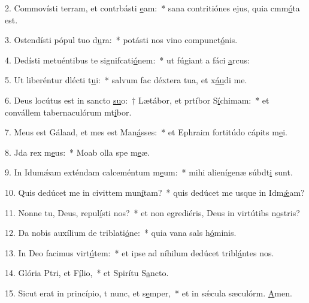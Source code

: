 2. Commovísti terram, et contrbásti \uline{e}am:~* sana contritiónes ejus, quia cmm\uline{ó}ta est.\par 
3. Ostendísti pópul tuo d\uline{u}ra:~* potásti nos vino compunct\uline{ó}nis.\par 
4. Dedísti metuéntibus te signifcati\uline{ó}nem:~* ut fúgiant a fáci \uline{a}rcus:\par 
5. Ut liberéntur dlécti t\uline{u}i:~* salvum fac déxtera tua, et x\uline{áu}di me.\par 
6. Deus locútus est in sancto \uline{su}o:~† Lætábor, et prtíbor S\uline{í}chimam:~* et convállem tabernaculórum mt\uline{í}bor.\par 
7. Meus est Gálaad, et mes est Man\uline{á}sses:~* et Ephraim fortitúdo cápits m\uline{e}i.\par 
8. Jda rex m\uline{e}us:~* Moab olla spe m\uline{e}æ.\par 
9. In Idumǽam exténdam calceméntum m\uline{e}um:~* mihi alienígenæ súbdt\uline{i} sunt.\par 
10. Quis dedúcet me in civittem mun\uline{í}tam?~* quis dedúcet me usque in Idm\uline{ǽ}am?\par 
11. Nonne tu, Deus,  repul\uline{í}sti nos?~* et non egrediéris, Deus in virtútibs n\uline{o}stris?\par 
12. Da nobis auxílium de triblati\uline{ó}ne:~* quia vana sals h\uline{ó}minis.\par 
13. In Deo facimus virt\uline{ú}tem:~* et ipse ad níhilum dedúcet tribl\uline{á}ntes nos.\par 
14. Glória Ptri, et F\uline{í}lio,~* et Spirítu S\uline{a}ncto.\par 
15. Sicut erat in princípio, t nunc, et s\uline{e}mper,~* et in sǽcula sæculórm. \uline{A}men.\par 
